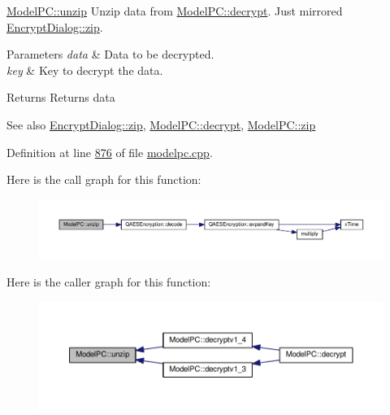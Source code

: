\hyperlink{class_model_p_c_a6da88f166785a49f73b22c169f956fd0}{Model\+P\+C\+::unzip} Unzip data from \hyperlink{class_model_p_c_a5995215a34a1e1f504035715a8013809}{Model\+P\+C\+::decrypt}. Just mirrored \hyperlink{class_encrypt_dialog_a2bff820a3df4ddc36ecb07ed74b7138a}{Encrypt\+Dialog\+::zip}. 


\begin{DoxyParams}{Parameters}
{\em data} & Data to be decrypted. \\
\hline
{\em key} & Key to decrypt the data. \\
\hline
\end{DoxyParams}
\begin{DoxyReturn}{Returns}
Returns data 
\end{DoxyReturn}
\begin{DoxySeeAlso}{See also}
\hyperlink{class_encrypt_dialog_a2bff820a3df4ddc36ecb07ed74b7138a}{Encrypt\+Dialog\+::zip}, \hyperlink{class_model_p_c_a5995215a34a1e1f504035715a8013809}{Model\+P\+C\+::decrypt}, \hyperlink{class_model_p_c_afebbbfa4b07deba4f68fc6dfb50f353f}{Model\+P\+C\+::zip} 
\end{DoxySeeAlso}


Definition at line \hyperlink{modelpc_8cpp_source_l00876}{876} of file \hyperlink{modelpc_8cpp_source}{modelpc.\+cpp}.



Here is the call graph for this function\+:
\nopagebreak
\begin{figure}[H]
\begin{center}
\leavevmode
\includegraphics[width=350pt]{class_model_p_c_a6da88f166785a49f73b22c169f956fd0_cgraph}
\end{center}
\end{figure}




Here is the caller graph for this function\+:
\nopagebreak
\begin{figure}[H]
\begin{center}
\leavevmode
\includegraphics[width=350pt]{class_model_p_c_a6da88f166785a49f73b22c169f956fd0_icgraph}
\end{center}
\end{figure}


